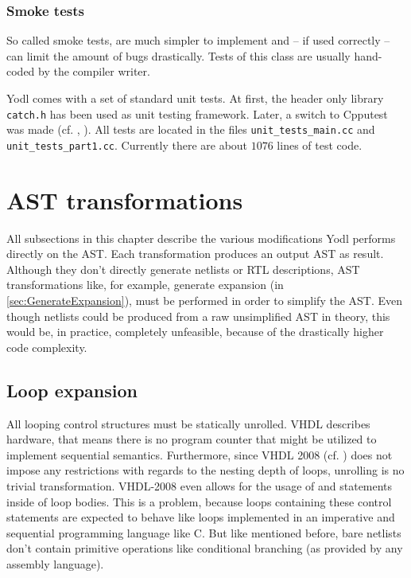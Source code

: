 \subsubsection{Smoke tests}

So called smoke tests, are much simpler to implement and --
if used correctly -- can limit the amount of bugs drastically. Tests
of this class are usually hand-coded by the compiler writer.

Yodl comes with a set of standard unit tests. At first, the header
only library \texttt{catch.h} has been used as unit testing
framework. Later, a switch to Cpputest was made (cf. \cite{CATCH},
\cite{CPPUTEST}). All tests are located in the files
\texttt{unit_tests_main.cc} and
\texttt{unit_tests_part1.cc}. Currently there are about \(1076\) lines
of test code.

\section{AST transformations}
\label{sec:astTrans}
All subsections in this chapter describe the various modifications
Yodl performs directly on the AST. Each transformation produces an
output AST as result. Although they don't directly generate netlists
or RTL descriptions, AST transformations like, for example, generate
expansion (in \ref{sec:GenerateExpansion}), must be performed in order
to simplify the AST. Even though netlists could be produced from a raw
unsimplified AST in theory, this would be, in practice, completely
unfeasible, because of the drastically higher code complexity.

\subsection{Loop expansion}
\label{sec:LoopExpansion}


All looping control structures must be statically unrolled. VHDL
describes hardware, that means there is no program counter that might
be utilized to implement sequential semantics. Furthermore, since VHDL
2008 (cf. \cite{IEEELRM})
does not impose any restrictions with regards to the nesting depth of
loops, unrolling is no trivial transformation. VHDL-2008 even allows
for the usage of  and  statements inside of loop
bodies. This is a problem, because loops containing these control
statements are expected to behave like loops implemented in an
imperative and sequential programming language like C. But like
mentioned before, bare netlists don't contain primitive operations
like conditional branching (as provided by any assembly language).

